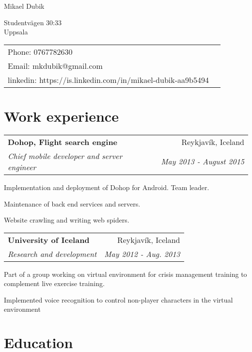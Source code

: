 \documentclass[letterpaper]{article}
\makeatletter
\def\name{Mikael Dubik}
\newcommand{\resitem}[1]{\item #1 \vspace{-2pt}}
\newcommand{\ressubheading}[4]{
\begin{tabular*}{6.5in}{l@{\extracolsep{\fill}}r}
    \textbf{#1} & #2 \\
    \textit{#3} & \textit{#4} \\
\end{tabular*}\vspace{-6pt}}
\renewenvironment{itemize}{
  \begin{list}{}{
    \setlength{\leftmargin}{1.5em}
  }
}{
  \end{list}
}
\makeatother
\begin{document}
{\huge \name}


\vspace{0.25in}

\begin{minipage}{0.45\linewidth}
  Studentvägen 30:33 \\
  Uppsala \\
\end{minipage}
\begin{minipage}{0.45\linewidth}
  \begin{tabular}{ll}
    Phone: 0767782630 \\
    Email: mkdubik@gmail.com \\
    linkedin: https://is.linkedin.com/in/mikael-dubik-aa9b5494 \\
  \end{tabular}
\end{minipage}

\section*{Work experience}

\begin{itemize}
\item
  \ressubheading{Dohop, Flight search engine}{Reykjavík, Iceland}{Chief mobile developer and server engineer}{May 2013 - August 2015}
  \begin{itemize}
    \resitem{Implementation and deployment of Dohop for Android. Team leader.}
    \resitem{Maintenance of back end services and servers.}
    \resitem{Website crawling and writing web spiders.}
  \end{itemize}

\item
  \ressubheading{University of Iceland}{Reykjavík, Iceland}{Research and development}{May 2012 - Aug. 2013}
  \begin{itemize}
    \resitem{Part of a group working on virtual environment for crisis management training to complement live exercise training.}
    \resitem{Implemented voice recognition to control non-player characters in the virtual environment}
  \end{itemize}

\end{itemize}

\section*{Education}
\end{document}

